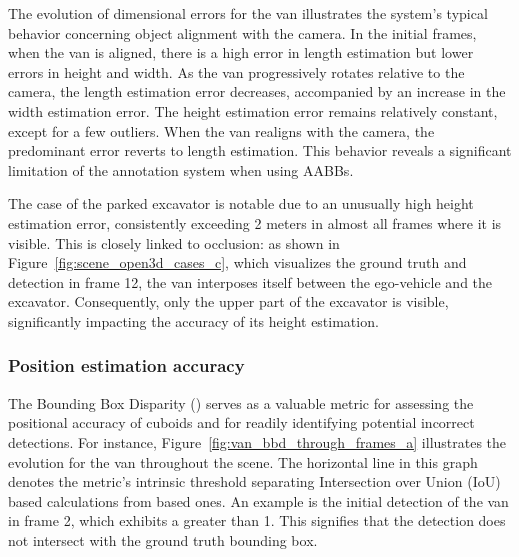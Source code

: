 The evolution of dimensional errors for the van illustrates the system's typical behavior concerning object alignment with the camera. In the initial frames, when the van is aligned, there is a high error in length estimation but lower errors in height and width. As the van progressively rotates relative to the camera, the length estimation error decreases, accompanied by an increase in the width estimation error. The height estimation error remains relatively constant, except for a few outliers. When the van realigns with the camera, the predominant error reverts to length estimation. This behavior reveals a significant limitation of the annotation system when using \acp{AABB}.

The case of the parked excavator is notable due to an unusually high height estimation error, consistently exceeding 2 meters in almost all frames where it is visible. This is closely linked to occlusion: as shown in Figure~\ref{fig:scene_open3d_cases_c}, which visualizes the ground truth and detection in frame 12, the van interposes itself between the ego-vehicle and the excavator. Consequently, only the upper part of the excavator is visible, significantly impacting the accuracy of its height estimation.

\subsubsection{Position estimation accuracy}
The Bounding Box Disparity () serves as a valuable metric for assessing the positional accuracy of cuboids and for readily identifying potential incorrect detections. For instance, Figure~\ref{fig:van_bbd_through_frames_a} illustrates the  evolution for the van throughout the scene. The horizontal line in this graph denotes the  metric's intrinsic threshold separating Intersection over Union (IoU) based calculations from  based ones. An example is the initial detection of the van in frame 2, which exhibits a  greater than 1. This signifies that the detection does not intersect with the ground truth bounding box. 

